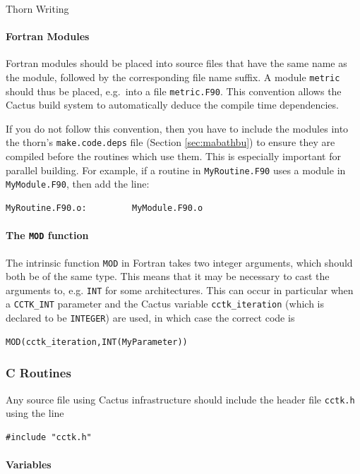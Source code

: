 \begin{cactuspart}{Thorn Writing}
\paragraph{Fortran Modules}
\label{par:fortran_modules}

Fortran modules should be placed into source files that have the same
name as the module, followed by the corresponding file name suffix.  A
module \texttt{metric} should thus be placed, e.g.\ into a file
\texttt{metric.F90}.  This convention allows the Cactus build system
to automatically deduce the compile time dependencies.

If you do not follow this convention, then you have to include the
modules into the thorn's \texttt{make.code.deps} file
(Section \ref{sec:mabathbu}) to ensure they are compiled before the routines
which use them.  This is especially important for parallel building.
For example, if a routine in \texttt{MyRoutine.F90} uses a module in {\tt
MyModule.F90}, then add the line:
%
\begin{verbatim}
MyRoutine.F90.o:         MyModule.F90.o
\end{verbatim}

\paragraph{The \texttt{MOD} function}

The intrinsic function \texttt{MOD} in Fortran takes two integer
arguments, which should both be of the same type. This means
that it may be necessary to cast the arguments to, e.g.
\texttt{INT} for some architectures. This can occur in particular
when a \texttt{CCTK\_INT} parameter and the Cactus variable \texttt{cctk\_iteration}
(which is declared to be \texttt{INTEGER}) are used,
in which case the correct code is
\begin{verbatim}
MOD(cctk_iteration,INT(MyParameter))
\end{verbatim}


\subsubsection{C Routines}

Any source file using Cactus infrastructure should include
the header file \texttt{cctk.h} using the line
\begin{verbatim}
#include "cctk.h"
\end{verbatim}

\paragraph{Variables}


\end{cactuspart}
